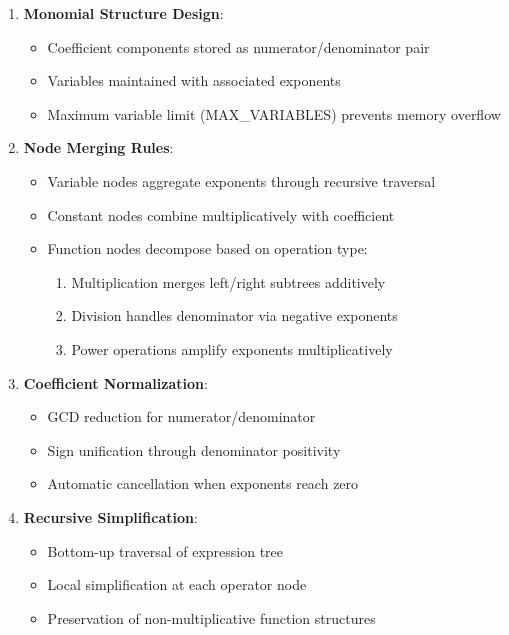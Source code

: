 \documentclass{report}
\begin{document}
\begin{enumerate}
    \item \textbf{Monomial Structure Design}:
    \begin{itemize}
        \item Coefficient components stored as numerator/denominator pair
        \item Variables maintained with associated exponents
        \item Maximum variable limit (MAX\_VARIABLES) prevents memory overflow
    \end{itemize}
    
    \item \textbf{Node Merging Rules}:
    \begin{itemize}
        \item Variable nodes aggregate exponents through recursive traversal
        \item Constant nodes combine multiplicatively with coefficient
        \item Function nodes decompose based on operation type:
        \begin{enumerate}
            \item Multiplication merges left/right subtrees additively
            \item Division handles denominator via negative exponents
            \item Power operations amplify exponents multiplicatively
        \end{enumerate}
    \end{itemize}
    
    \item \textbf{Coefficient Normalization}:
    \begin{itemize}
        \item GCD reduction for numerator/denominator
        \item Sign unification through denominator positivity
        \item Automatic cancellation when exponents reach zero
    \end{itemize}
    
    \item \textbf{Recursive Simplification}:
    \begin{itemize}
        \item Bottom-up traversal of expression tree
        \item Local simplification at each operator node
        \item Preservation of non-multiplicative function structures
    \end{itemize}
\end{enumerate}
\end{document}
